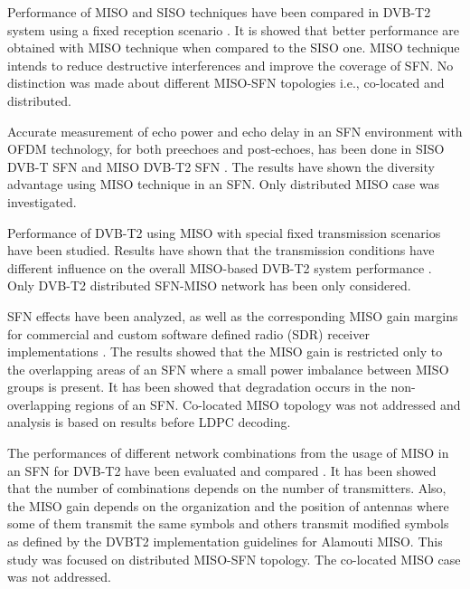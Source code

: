 \documentclass[10pt, conference]{IEEEtran}
\begin{document}
\normalsize{
    \hspace{1em} Performance of MISO and SISO techniques have been compared in DVB-T2 system using a fixed reception scenario \cite{3}. It is showed that better performance are obtained with MISO technique when compared to the SISO one. MISO technique intends to reduce destructive interferences and improve the coverage of SFN. No distinction was made about different MISO-SFN topologies i.e., co-located and distributed.
}

\normalsize{
    \hspace{1em} Accurate measurement of echo power and echo delay in an SFN environment with OFDM technology, for both preechoes and post-echoes, has been done in SISO DVB-T SFN and MISO DVB-T2 SFN \cite{10}. The results have shown the diversity advantage using MISO technique in an SFN. Only distributed MISO case was investigated.
}


\normalsize{
    \hspace{1em} Performance of DVB-T2 using MISO with special fixed transmission scenarios have been studied. Results have shown that the transmission conditions have different influence on the overall MISO-based DVB-T2 system performance \cite{11}. Only DVB-T2 distributed SFN-MISO network has been only considered.
}

\normalsize{
    \hspace{1em} SFN effects have been analyzed, as well as the corresponding MISO gain margins for commercial and custom software defined radio (SDR) receiver implementations \cite{12}. The results showed that the MISO gain is restricted only to the overlapping areas of an SFN where a small power imbalance between MISO groups is present. It has been showed that degradation occurs in the non-overlapping regions of an SFN. Co-located MISO topology was not addressed and analysis is based on results before LDPC decoding.
}

\normalsize{
    \hspace{1em} The performances of different network combinations from the usage of MISO in an SFN for DVB-T2 have been evaluated and compared \cite{13}. It has been showed that the number of combinations depends on the number of transmitters. Also, the MISO gain depends on the organization and the position of antennas where some of them transmit the same symbols and others transmit modified symbols as defined by the DVBT2 implementation guidelines \cite{14} for Alamouti MISO. This study was focused on distributed MISO-SFN topology. The co-located MISO case was not addressed.
}
\end{document}
